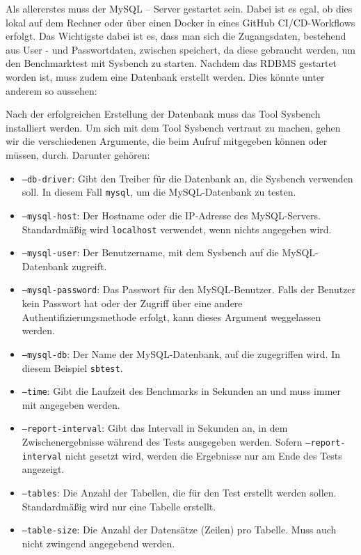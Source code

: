 Als allererstes muss der MySQL – Server gestartet sein.
Dabei ist es egal, ob dies lokal auf dem Rechner oder über einen Docker in eines GitHub CI/CD-Workflows erfolgt.
Das Wichtigste dabei ist es, dass man sich die Zugangsdaten, bestehend aus User - und Passwortdaten, zwischen speichert, da diese gebraucht werden, um den Benchmarktest mit Sysbench zu starten.
Nachdem das RDBMS gestartet worden ist, muss zudem eine Datenbank erstellt werden.
Dies könnte unter anderem so aussehen:



Nach der erfolgreichen Erstellung der Datenbank muss das Tool Sysbench installiert werden.
Um sich mit dem Tool Sysbench vertraut zu machen, gehen wir die verschiedenen Argumente, die beim Aufruf mitgegeben können oder müssen, durch.
Darunter gehören:

\begin{itemize}
    \item \texttt{--db-driver}: Gibt den Treiber für die Datenbank an, die Sysbench verwenden soll. In diesem Fall \texttt{mysql}, um die MySQL-Datenbank zu testen.
    \item \texttt{--mysql-host}: Der Hostname oder die IP-Adresse des MySQL-Servers. Standardmäßig wird \texttt{localhost} verwendet, wenn nichts angegeben wird.
    \item \texttt{--mysql-user}: Der Benutzername, mit dem Sysbench auf die MySQL-Datenbank zugreift.
    \item \texttt{--mysql-password}: Das Passwort für den MySQL-Benutzer. Falls der Benutzer kein Passwort hat oder der Zugriff über eine andere Authentifizierungsmethode erfolgt, kann dieses Argument weggelassen werden.
    \item \texttt{--mysql-db}: Der Name der MySQL-Datenbank, auf die zugegriffen wird. In diesem Beispiel \texttt{sbtest}.
    \item \texttt{--time}: Gibt die Laufzeit des Benchmarks in Sekunden an und muss immer mit angegeben werden.
    \item \texttt{--report-interval}: Gibt das Intervall in Sekunden an, in dem Zwischenergebnisse während des Tests ausgegeben werden.
    Sofern \texttt{--report-interval} nicht gesetzt wird, werden die Ergebnisse nur am Ende des Tests angezeigt.
    \item \texttt{--tables}: Die Anzahl der Tabellen, die für den Test erstellt werden sollen. Standardmäßig wird nur eine Tabelle erstellt.
    \item \texttt{--table-size}: Die Anzahl der Datensätze (Zeilen) pro Tabelle. Muss auch nicht zwingend angegebend werden.
\end{itemize}

